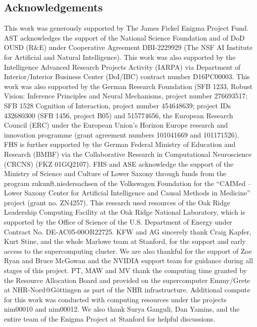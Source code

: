 \documentclass{article} %
\begin{document}
\subsection*{Acknowledgements}
This work was generously supported by The James Fickel Enigma Project Fund. AST acknowledges the support of the National Science Foundation and of DoD OUSD (R\&E) under Cooperative Agreement DBI-2229929 (The NSF AI Institute for Artificial and Natural Intelligence). This work was also supported by the Intelligence Advanced Research Projects Activity (IARPA) via Department of Interior/Interior Business Center (DoI/IBC) contract number D16PC00003. This work was also supported by the German Research Foundation (SFB 1233, Robust Vision: Inference Principles and Neural Mechanisms, project number 276693517; SFB 1528 Cognition of Interaction, project number 454648639; project IDs 432680300 (SFB 1456, project B05) and 515774656, the European Research Council (ERC) under the European Union’s Horizon Europe research and innovation programme (grant agreement numbers 101041669 and 101171526). FHS is further supported by the German Federal Ministry of Education and Research (BMBF) via the Collaborative Research in Computational Neuroscience (CRCNS) (FKZ 01GQ2107). FHS and ASE acknowledge the support of the Ministry of Science and Culture of Lower Saxony through funds from the program zukunft.niedersachsen of the Volkswagen Foundation for the ``CAIMed – Lower Saxony Center for Artificial Intelligence and Causal Methods in Medicine'' project (grant no. ZN4257). This research used resources of the Oak Ridge Leadership Computing Facility at the Oak Ridge National Laboratory, which is supported by the Office of Science of the U.S. Department of Energy under Contract No. DE-AC05-00OR22725. KFW and AG sincerely thank Craig Kapfer, Kurt Stine, and the whole Marlowe team at Stanford, for the support and early access to the supercomputing cluster. We are also thankful for the support of Zoe Ryan and Bruce McGowan and the NVIDIA support team for guidance during all stages of this project.
PT, MAW and MV thank the computing time granted by the Resource Allocation Board and provided on the supercomputer Emmy/Grete at NHR-Nord@Göttingen as part of the NHR infrastructure. Additional compute for this work was conducted with computing resources under the projects nim00010 and nim00012.
We also thank Surya Ganguli, Dan Yamins, and the entire team of the Enigma Project at Stanford for helpful discussions.
\end{document}
